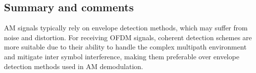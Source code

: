 \documentclass[a4paper]{article}
\begin{document}
\subsection{Summary and comments}

\noindent AM signals typically rely on envelope detection methods, which may suffer from noise and distortion. For receiving OFDM signals, coherent detection schemes are more suitable due to their ability to handle the complex multipath environment and mitigate inter symbol interference, making them preferable over envelope detection methods used in AM demodulation.
\end{document}
